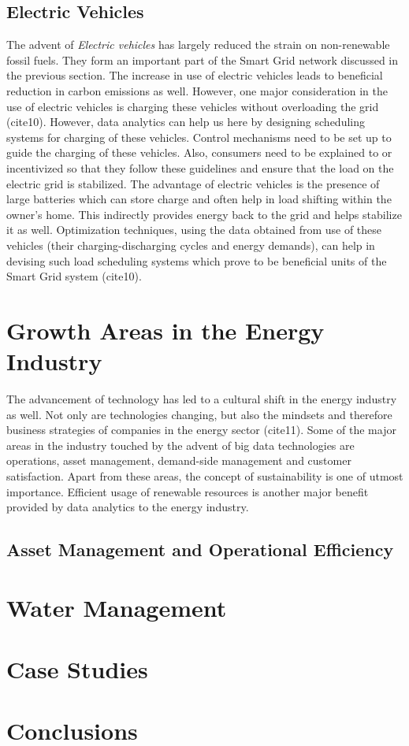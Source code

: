 \subsection{Electric Vehicles}
The advent of {\em Electric vehicles} has largely reduced the strain on non-renewable fossil fuels. They form an important part of the Smart Grid network discussed in the previous section. The increase in use of electric vehicles leads to beneficial reduction in carbon emissions as well. However, one major consideration in the use of electric vehicles is charging these vehicles without overloading the grid (cite10). However, data analytics can help us here by designing scheduling systems for charging of these vehicles. Control mechanisms need to be set up to guide the charging of these vehicles. Also, consumers need to be explained to or incentivized so that they follow these guidelines and ensure that the load on the electric grid is stabilized. The advantage of electric vehicles is the presence of large batteries which can store charge and often help in load shifting within the owner's home. This indirectly provides energy back to the grid and helps stabilize it as well. Optimization techniques, using the data obtained from use of these vehicles (their charging-discharging cycles and energy demands), can help in devising such load scheduling systems which prove to be beneficial units of the Smart Grid system (cite10). 


\section{Growth Areas in the Energy Industry}
The advancement of technology has led to a cultural shift in the energy industry as well. Not only are technologies changing, but also the mindsets and therefore business strategies of companies in the energy sector (cite11). Some of the major areas in the industry touched by the advent of big data technologies are operations, asset management, demand-side management and customer satisfaction. Apart from these areas, the concept of sustainability is one of utmost importance. Efficient usage of renewable resources is another major benefit provided by data analytics to the energy industry.

\subsection{Asset Management and Operational Efficiency}



\section{Water Management}

\section{Case Studies}


\section{Conclusions}


